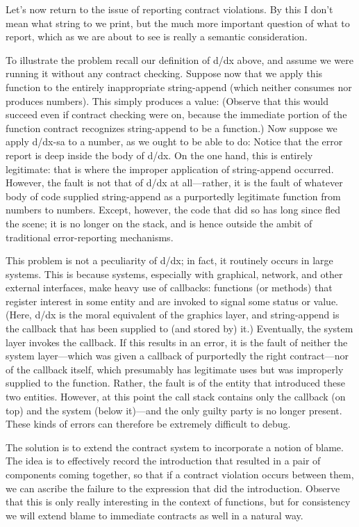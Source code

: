 
Let’s now return to the issue of reporting contract violations. By this I don’t
mean what string to we print, but the much more important question of what to
report, which as we are about to see is really a semantic consideration.

To illustrate the problem recall our definition of d/dx above, and assume we
were running it without any contract checking. Suppose now that we apply this
function to the entirely inappropriate string-append (which neither consumes nor
produces numbers). This simply produces a value:
(Observe that this would succeed even if contract checking were on, because the
immediate portion of the function contract recognizes string-append to be a
function.) Now suppose we apply d/dx-sa to a number, as we ought to be able to
do:
Notice that the error report is deep inside the body of d/dx. On the one hand,
this is entirely legitimate: that is where the improper application of
string-append occurred. However, the fault is not that of d/dx at all—rather, it
is the fault of whatever body of code supplied string-append as a purportedly
legitimate function from numbers to numbers. Except, however, the code that did
so has long since fled the scene; it is no longer on the stack, and is hence
outside the ambit of traditional error-reporting mechanisms.

This problem is not a peculiarity of d/dx; in fact, it routinely occurs in large
systems. This is because systems, especially with graphical, network, and other
external interfaces, make heavy use of callbacks: functions (or methods) that
register interest in some entity and are invoked to signal some status or value.
(Here, d/dx is the moral equivalent of the graphics layer, and string-append is
the callback that has been supplied to (and stored by) it.) Eventually, the
system layer invokes the callback. If this results in an error, it is the fault
of neither the system layer—which was given a callback of purportedly the right
contract—nor of the callback itself, which presumably has legitimate uses but
was improperly supplied to the function. Rather, the fault is of the entity that
introduced these two entities. However, at this point the call stack contains
only the callback (on top) and the system (below it)—and the only guilty party
is no longer present. These kinds of errors can therefore be extremely difficult
to debug.

The solution is to extend the contract system to incorporate a notion of blame.
The idea is to effectively record the introduction that resulted in a pair of
components coming together, so that if a contract violation occurs between them,
we can ascribe the failure to the expression that did the introduction. Observe
that this is only really interesting in the context of functions, but for
consistency we will extend blame to immediate contracts as well in a natural
way.

